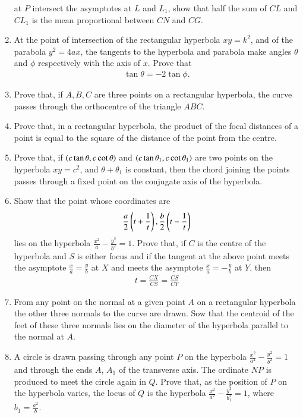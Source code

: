 \begin{enumerate}[1.]
at $P$ intersect the asymptotes at $L$ and $L_1$, show that half the sum of $CL$ and $CL_1$ is the mean
proportional between $CN$ and $CG$.
\item At the point of intersection of the rectangular hyperbola $xy=k^2$, and of the parabola $y^2=4ax$, the tangents
to the hyperbola and parabola make angles $\theta$ and $\phi$ respectively with the axis of $x$.  Prove that
\begin{align*}
\tan\theta = -2\tan\phi.
\end{align*}
\item Prove that, if $A, B, C$ are three points on a rectangular hyperbola, the curve passes through the orthocentre
of the triangle $ABC$.
\item Prove that, in a rectangular hyperbola, the product of the focal distances of a point is equal
to the square of the distance of the point from the centre.
\item Prove that, if $\left(c\tan\theta,c\cot\theta\right)$ and $\left(c\tan\theta_1,c\cot\theta_1\right)$ are two points on 
the hyperbola $xy=c^2$, and $\theta+\theta_1$ is constant, then the chord
joining the points passes through a fixed point on the conjugate axis of the hyperbola.
\item Show that the point whose coordinates are
\begin{align*}
\frac{a}{2}\left(t+\frac{1}{t}\right), \frac{b}{2}\left(t-\frac{1}{t}\right)
\end{align*}
lies on the hyperbola $\frac{x^2}{a}-\frac{y^2}{b^2} = 1$. Prove that, if $C$ is the centre of the hyperbola and $S$ is either focus 
and if the tangent at the above point meets the asymptote $\frac{x}{a}=\frac{y}{b}$ at $X$ and meets the asymptote $\frac{x}{a}=-\frac{y}{b}$
 at $Y$, then
\begin{align*}
t = \frac{CX}{CS} = \frac{CS}{CY}
\end{align*}
\item From any point on the normal at a given point $A$ on a rectangular hyperbola the other three normals to
the curve are drawn.  Sow that the centroid of the feet of these three normals lies on the diameter of the hyperbola
parallel to the normal at $A$.
\item A circle is drawn passing through any point $P$ on the hyperbola $\frac{x^2}{a^2}-\frac{y^2}{b^2}=1$ and through the ends $A$, $A_1$ of
the transverse axis.  The ordinate $NP$ is produced to  meet the circle again in $Q$.  Prove that, as
the position of $P$ on the hyperbola varies, the locus of $Q$ is the hyperbola $\frac{x^2}{a^2}-\frac{y^2}{b_1^2} = 1$, where $b_1 = \frac{a^2}{b}$.
\end{enumerate}